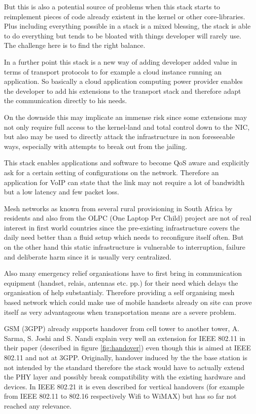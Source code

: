 \documentclass[twocolumn,english]{IEEEtran}
\theoremstyle{plain}
\theoremstyle{plain}
\begin{document}
But this is also a potential source of problems when this stack starts to
reimplement pieces of code already existent in the kernel or other
core-libraries. Plus including everything possible in a stack is a mixed
blessing, the stack is able to do everything but tends to be bloated with things
developer will rarely use. The challenge here is to find the right balance.

In a further point this stack is a new way of adding developer added value in
terms of transport protocols to for example a cloud instance running an
application. So basically a cloud application computing power provider
enables the developer to add his extensions to the transport stack and
therefore adapt the communication directly to his needs.

On the downside this may implicate an immense risk since some extensions may
not only require full access to the kernel-land and total control down to the
NIC, but also may be used to directly attack the infrastructure in non
foreseeable ways, especially with attempts to break out from the jailing.

This stack enables applications and software to become QoS aware and
explicitly ask for a certain setting of configurations on the network.
Therefore an application for VoIP can state that the link may not require a
lot of bandwidth but a low latency and few packet loss.

Mesh networks as known from several rural provisioning in South Africa by
residents and also from the OLPC (One Laptop Per
Child\cite{olpc:meshnetwork}) project are not of real interest in first world
countries since the pre-existing infrastructure covers the daily need better
than a fluid setup which needs to reconfigure itself often. But on the other
hand this static infrastructure is vulnerable to interruption, failure and
deliberate harm since it is usually very centralized.

Also many emergency relief organisations have to first bring in communication
equipment (handset, relais, antennas etc. pp.) for their need which delays the
organisation of help substantialy. Therefore providing a self organising mesh
based network which could make use of mobile handsets already on site can
prove itself as very advantageous when transportation means are a severe
problem.

GSM (3GPP) already supports handover from cell tower to another tower, A.
Sarma, S. Joshi and S. Nandi explain very well an extension for IEEE 802.11 in
their paper \cite{ijcn:ieee80211-handover} (described in figure
\ref{fig:handover}) even though this is aimed at IEEE 802.11 and not at 3GPP.
Originally, handover induced by the the base station is not intended by the
standard therefore the stack would have to actually extend the PHY layer and
possibly break compatibility with the existing hardware and devices. In IEEE
802.21 it is even described for vertical handovers (for example from IEEE
802.11 to 802.16 respectively Wifi to WiMAX) but has so far not reached any
relevance.
\end{document}
